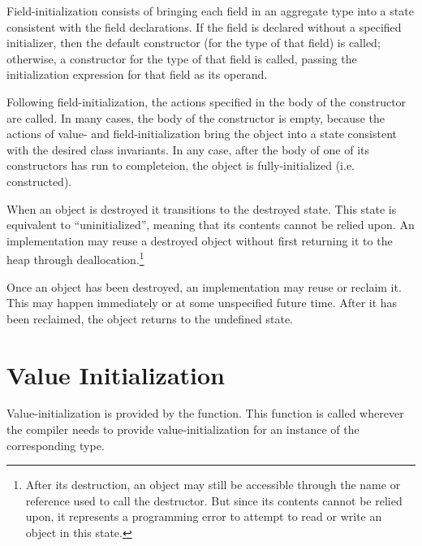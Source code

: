 Field-initialization consists of bringing each field in an aggregate type into a
state consistent with the field declarations.  If the field is declared without
a specified initializer, then the default constructor (for the type of that
field) is called; otherwise, a constructor for the type of that field is called,
passing the initialization expression for that field as its operand.

Following field-initialization, the actions specified in the body of the
constructor are called.  In many cases, the body of the constructor is empty,
because the actions of value- and field-initialization bring the object into a
state consistent with the desired class invariants.  In any case, after the body
of one of its constructors has run to completeion, the object is
fully-initialized (i.e. constructed).

When an object is destroyed it transitions to the destroyed state.  This state
is equivalent to ``uninitialized'', meaning that its contents cannot be relied
upon.  An implementation may reuse a destroyed object without first returning it
to the heap through deallocation.\footnote{After its destruction, an object may
  still be accessible through the name or reference used to call the
  destructor.  But since its contents cannot be relied upon, it represents a
  programming error to attempt to read or write an object in this state.}

Once an object has been destroyed, an implementation may reuse or reclaim it.
This may happen immediately or at some unspecified future time.  After it has
been reclaimed, the object returns to the undefined state.



\section{Value Initialization}

Value-initialization is provided by the  function.
This function is called wherever the compiler needs to provide value-initialization
for an instance of the corresponding type.  

